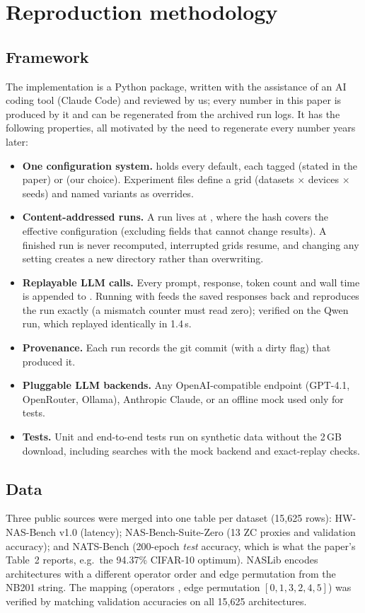 \section{Reproduction methodology}\label{sec:method}

\subsection{Framework}
The implementation is a Python package, written with the assistance of an AI coding tool (Claude Code) and reviewed by us; every number in this paper is produced by it and can be regenerated from the archived run logs. It has the following properties, all motivated by the need to regenerate every number years later:
\begin{itemize}[nosep]
  \item \textbf{One configuration system.}  holds every default, each tagged \code{[paper]} (stated in the paper) or \code{[assumed]} (our choice). Experiment files define a grid (datasets $\times$ devices $\times$ seeds) and named variants as overrides.
  \item \textbf{Content-addressed runs.} A run lives at , where the hash covers the effective configuration (excluding fields that cannot change results). A finished run is never recomputed, interrupted grids resume, and changing any setting creates a new directory rather than overwriting.
  \item \textbf{Replayable LLM calls.} Every prompt, response, token count and wall time is appended to . Running with  feeds the saved responses back and reproduces the run exactly (a mismatch counter must read zero); verified on the Qwen run, which replayed identically in 1.4\,s.
  \item \textbf{Provenance.} Each run records the git commit (with a dirty flag) that produced it.
  \item \textbf{Pluggable LLM backends.} Any OpenAI-compatible endpoint (GPT-4.1, OpenRouter, Ollama), Anthropic Claude, or an offline mock used only for tests.
  \item \textbf{Tests.} Unit and end-to-end tests run on synthetic data without the 2\,GB download, including searches with the mock backend and exact-replay checks.
\end{itemize}

\subsection{Data}
Three public sources were merged into one table per dataset (15{,}625 rows): HW-NAS-Bench v1.0 (latency); NAS-Bench-Suite-Zero  (13 ZC proxies and validation accuracy); and NATS-Bench \cite{nats} (200-epoch \emph{test} accuracy, which is what the paper's Table~2 reports, e.g.\ the 94.37\% CIFAR-10 optimum). NASLib encodes architectures with a different operator order and edge permutation from the NB201 string. The mapping (operators , edge permutation $[0,1,3,2,4,5]$) was verified by matching validation accuracies on all 15{,}625 architectures.

